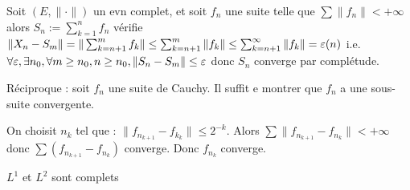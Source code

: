 \documentclass[10pt,a4paper,notitlepage ]{report}
\begin{document}
\begin{demo}
	Soit $(E,\|\cdot\|)$ un evn complet, et soit $f_n$ une suite telle que $\sum\|f_n\| < + \infty$ alors $S_n := \sum_{k=1}^n f_n$ vérifie $\|X_n-S_m\| = \|\sum_{k=n+1}^m f_k\| \le \sum_{k=n+1}^m \|f_k\| \le \sum_{k=n+1}^\infty \|f_k\| = \varepsilon(n)$ i.e. $\forall \varepsilon, \exists n_0, \forall m\ge n_0, n\ge n_0, \|S_n-S_m\| \le \varepsilon$ donc $S_n$ converge par complétude.
	
	Réciproque : soit $f_n$ une suite de Cauchy. Il suffit e montrer que $f_n$ a une sous-suite convergente.
	
	On choisit $n_k$ tel que : $\|f_{n_{k+1}}-f_{k_k}\|\le 2^{-k}$. Alors $\sum \|f_{n_{k+1}} - f_{n_k}\| < + \infty$ donc $\sum(f_{n_{k+1}} - f_{n_k})$ converge. Donc $f_{n_k}$ converge.
\end{demo}

\begin{theorem}
	$L^1$ et $L^2$ sont complets
\end{theorem}
\end{document}
